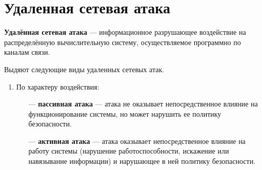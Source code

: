 \documentclass{bmstu}
\begin{document}


\section{Удаленная сетевая атака}

\textbf{Удалённая сетевая атака} --- информационное разрушающее воздействие на распределённую вычислительную систему, осуществляемое программно по каналам связи.

Выдяют следующие виды удаленных сетевых атак.

\begin{enumerate}
    \item По характеру воздействия:
        \begin{itemize}
            \item[---] \textbf{пассивная атака} --- атака не оказывает непосредственное влияние на функционирование системы, но может нарушить ее политику безопасности. 
            \item[---] \textbf{активная атака} --- атака оказывает непосредственное влияние на работу системы (нарушение работоспособности, искажение или навязывание информации) и нарушающее в ней политику безопасности. 
            

\end{itemize}
\end{enumerate}
\end{document}
